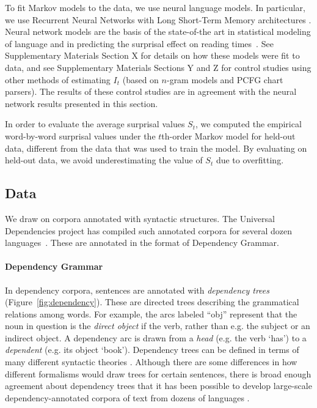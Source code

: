 To fit Markov models to the data, we use neural language models. In particular, we use Recurrent Neural Networks with Long Short-Term Memory architectures \citep{hochreiter-long-1997}. 
Neural network models are the basis of the state-of-the art in statistical modeling of language and in predicting the surprisal effect on reading times~\citep{frank-insensitivity-2011,goodkind-predictive-2018}.
See Supplementary Materials Section X for details on how these models were fit to data, and see Supplementary Materials Sections Y and Z for control studies using other methods of estimating $I_t$ (based on $n$-gram models and PCFG chart parsers). The results of these control studies are in agreement with the neural network results presented in this section.

In order to evaluate the average surprisal values $S_t$, we computed the empirical word-by-word surprisal values under the $t$th-order Markov model for held-out data, different from the data that was used to train the model. By evaluating on held-out data, we avoid underestimating the value of $S_t$ due to overfitting.




\subsection{Data}
We draw on corpora annotated with syntactic structures.
The Universal Dependencies project has compiled such annotated corpora for several dozen languages~\citep{nivre-universal-2017}.
These are annotated in the format of Dependency Grammar.

\paragraph{Dependency Grammar}
In dependency corpora, sentences are annotated with \emph{dependency trees} (Figure~\ref{fig:dependency}).
These are directed trees describing the grammatical relations among words. For example, the arcs labeled ``obj'' represent that the noun in question is the \emph{direct object} if the verb, rather than e.g. the subject or an indirect object.
A dependency arc is drawn from a \emph{head} (e.g. the verb `has') to a \emph{dependent} (e.g. its object `book').
Dependency trees can be defined in terms of many different syntactic theories \citep{corbett1993heads}.
Although there are some differences in how different formalisms would draw trees for certain sentences, there is broad enough agreement about dependency trees that it has been possible to develop large-scale dependency-annotated corpora of text from dozens of languages \citep{nivre2017universal}.

